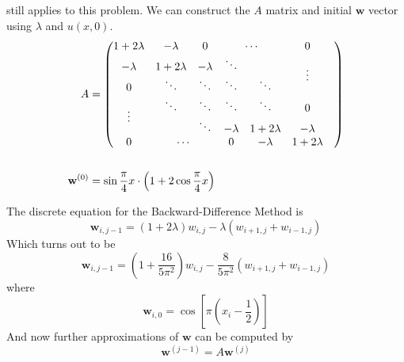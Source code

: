 \documentclass[12pt]{article}
\begin{document}
 still applies to this problem. We can construct the
$A$ matrix and initial $\mathbf{w}$ vector using $\lambda$ and $u(x,0)$.
\begin{equation}
  \label{eq:8b_A}
  \begin{aligned}
    A &=
    \begin{pmatrix}
      1+2\lambda & -\lambda    & 0       & \multicolumn{2}{c}{\cdots} & 0 \\
      -\lambda    & 1+2\lambda & -\lambda & \ddots &  & \multirow{2}{*}{\vdots} \\
      0 & \ddots & \ddots & \ddots & \ddots & & \\
      \multirow{2}{*}{\vdots} & \ddots & \ddots & \ddots & \ddots & 0 \\
      & & \ddots & -\lambda & 1+2\lambda & -\lambda \\
      0 & \multicolumn{2}{c}{\cdots} & 0 & -\lambda & 1+2\lambda \\
    \end{pmatrix} \\
    \\
    \mathbf{w}^{(0)} &= \sin\frac{\pi}{4}x \cdot
    \left(1+2\cos\frac{\pi}{4}x\right)\\
  \end{aligned}
\end{equation}

The discrete equation for the Backward-Difference Method is
\begin{equation}
  \label{eq:8b_discrete}
  \mathbf{w}_{i,j-1}=(1+2\lambda)w_{i,j}-\lambda(w_{i+1,j}+w_{i-1,j})
\end{equation}
Which turns out to be 
\begin{equation}
  \label{eq:8b_discrete_val}
  \mathbf{w}_{i,j-1}=\left(1+\frac{16}{5\pi^2}\right)w_{i,j}-\frac{8}{5\pi^2}(w_{i+1,j}+w_{i-1,j})
\end{equation}
where 
\begin{equation}
  \label{eq:8b_w_i_0}
  \mathbf{w}_{i,0} = \cos\left[\pi\left(x_i-\frac{1}{2}\right)\right]
\end{equation}
And now further approximations of $\mathbf{w}$ can be computed by
\begin{equation}
  \label{eq:8b_wnext}
  \mathbf{w}^{(j-1)} = A\mathbf{w}^{(j)}
\end{equation}
\end{document}
